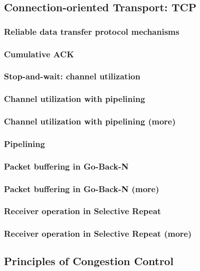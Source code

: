 \subsection*{Connection-oriented Transport: TCP}
    \subsubsection*{Reliable data transfer protocol mechanisms}
    \subsubsection*{Cumulative ACK}
    \subsubsection*{Stop-and-wait: channel utilization}
    \subsubsection*{Channel utilization with pipelining}
    \subsubsection*{Channel utilization with pipelining (more)}
    \subsubsection*{Pipelining}
    \subsubsection*{Packet buffering in Go-Back-N}
    \subsubsection*{Packet buffering in Go-Back-N (more)}
    \subsubsection*{Receiver operation in Selective Repeat}
    \subsubsection*{Receiver operation in Selective Repeat (more)}

\subsection*{Principles of Congestion Control}
